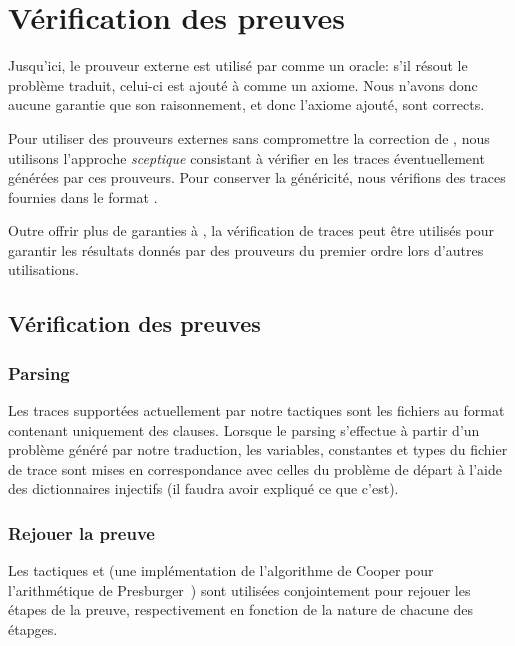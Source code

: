 \section{Vérification des preuves \tff}
\label{sec:traces}

Jusqu'ici, le prouveur externe est utilisé par \holfour comme un
oracle: s'il résout le problème traduit, celui-ci est ajouté à \holfour
comme un axiome. Nous n'avons donc aucune garantie que son raisonnement,
et donc l'axiome ajouté, sont corrects.

Pour utiliser des prouveurs externes sans compromettre la correction de
\holfour, nous utilisons l'approche \emph{sceptique} consistant à
vérifier en \holfour les traces éventuellement générées par ces
prouveurs. Pour conserver la généricité, nous vérifions des traces
fournies dans le format \tff.

Outre offrir plus de garanties à \holfour, la vérification de traces
\tff peut être utilisés pour garantir les résultats donnés par des
prouveurs du premier ordre lors d'autres utilisations.


\subsection{Vérification des preuves}
\subsubsection{Parsing}

Les traces supportées actuellement par notre tactiques sont les fichiers
au format \tff contenant uniquement des clauses. Lorsque le parsing
s'effectue à partir d'un problème généré par notre traduction, les
variables, constantes et types du fichier de trace sont mises en
correspondance avec celles du problème de départ à l'aide des
dictionnaires injectifs (\todo il faudra avoir expliqué ce que c'est).


\subsubsection{Rejouer la preuve}

Les tactiques \metistac et \coopertac (une implémentation de
l'algorithme de Cooper pour l'arithmétique de
Presburger~\cite{Norrish03completeinteger}) sont utilisées conjointement
pour rejouer les étapes de la preuve, respectivement en fonction de la
nature de chacune des étapges.

